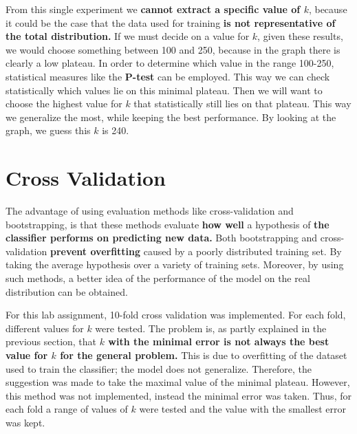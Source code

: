 \documentclass[a4paper]{article}
\begin{document}
From this single experiment we \textbf{cannot extract a specific value of $k$}, because it could be the case that the data used for training \textbf{is not representative of the total distribution.} 
If we must decide on a value for $k$, given these results, we would choose something between 100 and 250, because in the graph there is clearly a low plateau. In order to determine which value in the range 100-250, statistical measures like the \textbf{P-test} can be employed. This way we can check statistically which values lie on this minimal plateau. Then we will want to choose the highest value for $k$ that statistically still lies on that plateau. This way we generalize the most, while keeping the best performance. By looking at the graph, we guess this $k$ is 240.

\section{Cross Validation}
The advantage of using evaluation methods like cross-validation and bootstrapping, is that these methods evaluate \textbf{how well} a hypothesis of \textbf{the classifier performs on predicting new data.} Both bootstrapping and cross-validation \textbf{prevent overfitting} caused by a poorly distributed training set. By taking the average hypothesis over a variety of training sets.
Moreover, by using such methods, a better idea of the performance of the model on the real distribution can be obtained.

For this lab assignment, 10-fold cross validation was implemented. For each fold, different values for $k$ were tested. The problem is, as partly explained in the previous section, that \textbf{$k$ with the minimal error is not always the best value for $k$ for the general problem.} This is due to overfitting of the dataset used to train the classifier; the model does not generalize. Therefore, the suggestion was made to take the maximal value of the minimal plateau. However, this method was not implemented, instead the minimal error was taken. Thus, for each fold a range of values of $k$ were tested and the value with the smallest error was kept.
\end{document}
